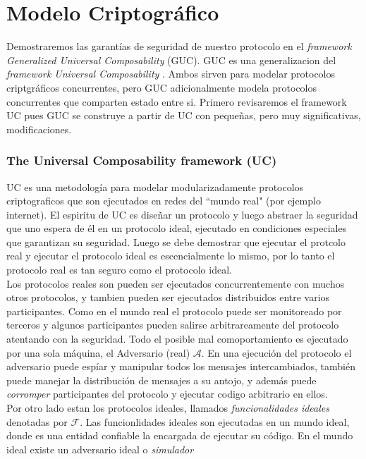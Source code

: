 \chapter{Modelo Criptográfico}

Demostraremos las garantías de seguridad de nuestro protocolo en el
\textit{framework Generalized Universal Composability} (GUC). GUC \cite{conf/tcc/CanettiDPW07}
es una generalizacion del \textit{framework Universal Composability}
\cite{conf/focs/Canetti01}. Ambos sirven para modelar protocolos criptgráficos concurrentes,
pero GUC adicionalmente modela protocolos concurrentes que comparten estado entre si.
Primero revisaremos el framework UC pues GUC se construye a partir de UC con pequeñas,
pero muy significativas, modificaciones.\\

\subsection{The Universal Composability framework (UC)}
UC es una metodología para modelar modularizadamente protocolos criptograficos que son ejecutados en redes
del ``mundo real" (por ejemplo internet). El espiritu de UC es diseñar un protocolo y luego abstraer la
seguridad que uno espera de él en un protocolo ideal, ejecutado en condiciones especiales que garantizan
su seguridad. Luego se debe demostrar que ejecutar el protcolo real y ejecutar el protocolo ideal es
escencialmente lo mismo, por lo tanto el protocolo real es tan seguro como el protocolo ideal.\\
Los protocolos reales son pueden ser ejecutados concurrentemente con muchos otros protocolos,
y tambien pueden ser ejecutados distribuidos entre varios participantes.
Como en el mundo real el protocolo puede ser monitoreado por terceros y algunos participantes pueden salirse
arbitrareamente del protocolo atentando con la seguridad. Todo el posible mal comoportamiento es ejecutado por una sola
máquina, el Adversario (real) $\mathcal{A}$. En una ejecución del protocolo el adversario puede espíar y
manipular todos los mensajes intercambiados, también puede manejar la distribución de mensajes a su antojo,
y además puede \textit{corromper} participantes del protocolo y ejecutar codigo arbitrario en ellos.\\
Por otro lado estan los protocolos ideales, llamados \textit{funcionalidades ideales} denotadas por 
$\mathcal{F}$. Las funcionlidades ideales son ejecutadas en un mundo ideal, donde es una entidad confiable
la encargada de ejecutar su código. En el mundo ideal existe un adversario ideal o \textit{simulador}
